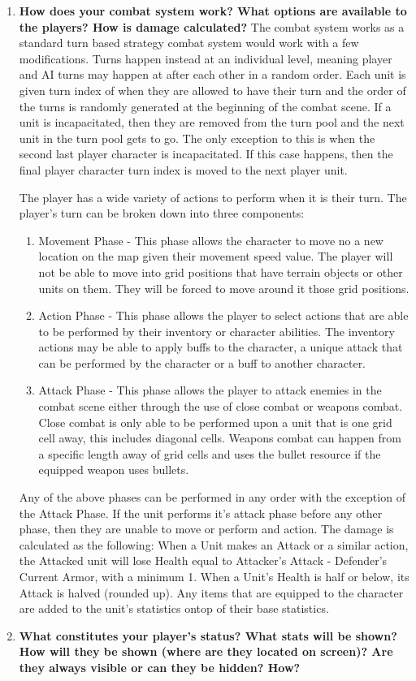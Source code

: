 \documentclass[12pt, titlepage]{article}
\begin{document}
\begin{enumerate}
	\item \textbf{How does your combat system work? What options are available to the players? How is damage calculated?}
	The combat system works as a standard turn based strategy combat system would work with a few modifications. Turns happen instead at an individual level, meaning player and AI turns may happen at after each other in a random order. Each unit is given turn index of when they are allowed to have their turn and the order of the turns is randomly generated at the beginning of the combat scene. If a unit is incapacitated, then they are removed from the turn pool and the next unit in the turn pool gets to go. The only exception to this is when the second last player character is incapacitated. If this case happens, then the final player character turn index is moved to the next player unit.
	
	The player has a wide variety of actions to perform when it is their turn. The player's turn can  be broken down into three components:
	\begin{enumerate}
	\item Movement Phase - This phase allows the character to move no a new location on the map given their movement speed value. The player will not be able to move into grid positions that have terrain objects or other units on them. They will be forced to move around it those grid positions. 
	\item Action Phase - This phase allows the player to select actions that are able to be performed by their inventory or character abilities. The inventory actions may be able to apply buffs to the character, a unique attack that can be performed by the character or a buff to another character. 
	\item Attack Phase - This phase allows the player to attack enemies in the combat scene either through the use of close combat or weapons combat. Close combat is only able to be performed upon a unit that is one grid cell away, this includes diagonal cells. Weapons combat can happen from a specific length away of grid cells and uses the bullet resource if the equipped weapon uses bullets. 
	\end{enumerate}
	Any of the above phases can be performed in any order with the exception of the Attack Phase. If the unit performs it's attack phase before any other phase, then they are unable to move or perform and action.
	The damage is calculated as the following:
	When a Unit makes an Attack or a similar action, the Attacked unit will lose Health equal to Attacker’s Attack - Defender’s Current Armor, with a minimum 1. When a Unit’s Health is half or below, its Attack is halved (rounded up). Any items that are equipped to the character are added to the unit's statistics ontop of their base statistics.
	\item\textbf{ What constitutes your player's status? What stats will be shown? How will they be shown (where are they located on screen)? Are they always visible or can they be hidden? How?}


\end{enumerate}
\end{document}
